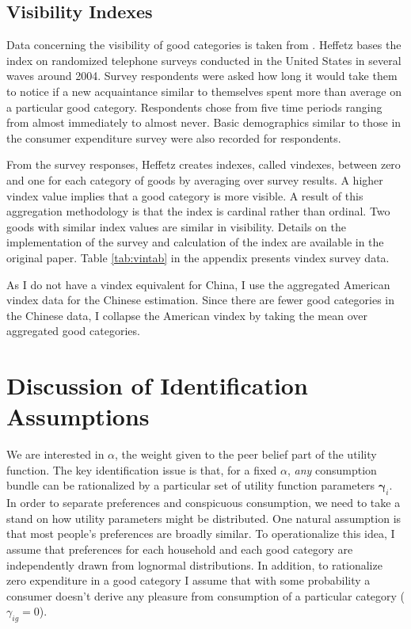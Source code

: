 \documentclass[12pt]{article}
\begin{document}
\subsection{Visibility Indexes}
Data concerning the visibility of good categories is taken from \citet{heffetz2011}.  
Heffetz bases the index on randomized telephone surveys conducted in the United States in several waves around 2004.
Survey respondents were asked how long it would take them to notice if a new acquaintance similar to themselves spent more than average on a particular good category.
Respondents chose from five time periods ranging from almost immediately to almost never.
Basic demographics similar to those in the consumer expenditure survey were also recorded for respondents.

From the survey responses, Heffetz creates indexes, called vindexes, between zero and one for each category of goods by averaging over survey results. 
A higher vindex value implies that a good category is more visible. 
A result of this aggregation methodology is that the index is cardinal rather than ordinal.  Two goods with similar index values are similar in visibility.  Details on the implementation of the survey and calculation of the index are available in the original paper.
Table \ref{tab:vintab} in the appendix presents vindex survey data.

As I do not have a vindex equivalent for China, I use the aggregated American vindex data for the Chinese estimation. Since there are fewer good categories in the Chinese data, I collapse the American vindex by taking the mean over aggregated good categories.

\section{Discussion of Identification Assumptions}

We are interested in $\alpha$, the weight given to the peer belief part of the utility function.  The key identification issue is that, for a fixed $\alpha$, \emph{any} consumption bundle can be rationalized by a particular set of utility function parameters $\boldsymbol{\gamma}_i$.  In order to separate preferences and conspicuous consumption, we need to take a stand on how utility parameters might be distributed.  One natural assumption is that most people's preferences are broadly similar.  To operationalize this idea, I assume that preferences for each household and each good category are independently drawn from lognormal distributions.  In addition, to rationalize zero expenditure in a good category I assume that with some probability a consumer doesn't derive any pleasure from consumption of a particular category ($\gamma_{ig} = 0$).
\end{document}
